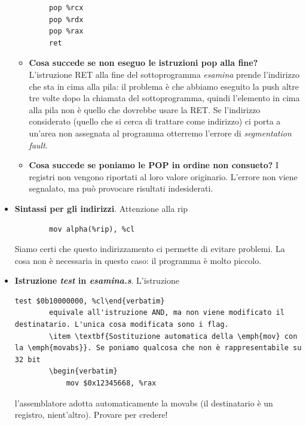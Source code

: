 \begin{itemize}
\begin{verbatim}
		pop %rcx
		pop %rdx
		pop %rax
		ret
	\end{verbatim}
	\begin{itemize}
		\item \textbf{Cosa succede se non eseguo le istruzioni pop alla fine?} L'istruzione RET alla fine del sottoprogramma \emph{esamina} prende l'indirizzo che sta in cima alla pila: il problema è che abbiamo eseguito la push altre tre volte dopo la chiamata del sottoprogramma, quindi l'elemento in cima alla pila non è quello che dovrebbe usare la RET. Se l'indirizzo considerato (quello che si cerca di trattare come indirizzo) ci porta a un'area non assegnata al programma otterremo l'errore di \emph{segmentation fault}.
		\item \textbf{Cosa succede se poniamo le POP in ordine non consueto?} I registri non vengono riportati al loro valore originario. L'errore non viene segnalato, ma può provocare risultati indesiderati.
	\end{itemize}
	\item \textbf{Sintassi per gli indirizzi}. Attenzione alla rip
	\begin{verbatim}
		mov alpha(%rip), %cl
	\end{verbatim}
	Siamo certi che questo indirizzamento ci permette di evitare problemi. La cosa non è necessaria in questo caso: il programma è molto piccolo.
	\item \textbf{Istruzione \emph{test} in \emph{esamina.s}}. L'istruzione
	\begin{verbatim}test $0b10000000, %cl\end{verbatim}
		equivale all'istruzione AND, ma non viene modificato il destinatario. L'unica cosa modificata sono i flag. 
		\item \textbf{Sostituzione automatica della \emph{mov} con la \emph{movabs}}. Se poniamo qualcosa che non è rappresentabile su 32 bit
		\begin{verbatim}
			mov $0x12345668, %rax
		\end{verbatim}
		l'assemblatore adotta automaticamente la movabs (il destinatario è un registro, nient'altro). Provare per credere!
\end{itemize}
